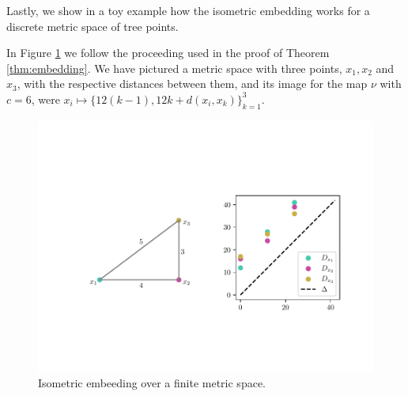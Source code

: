 Lastly, we show in a toy example how the isometric embedding works for a discrete metric space of tree points.

\begin{example}
    In Figure \ref{fig:2} we follow the proceeding used in the proof of Theorem \ref{thm:embedding}. We have pictured a metric space with three points, $x_1, x_2 $ and $ x_3 $, with the respective distances between them, and its image for the map $ \nu $ with $ c = 6 $, were $ x_i \mapsto \{12(k-1), 12k + d(x_i, x_k) \}_{k=1}^3 $.
    
    \begin{figure}[h] \label{fig:2}
        \centering
        \includegraphics[width=15cm]{Figures/figure-2.pdf}
        \vspace{-70pt}
        \caption{Isometric embeeding over a finite metric space.}
    \end{figure}
\end{example}
